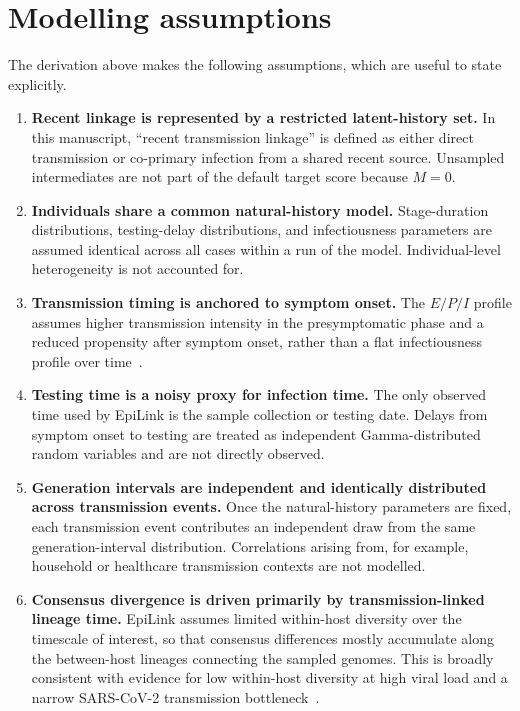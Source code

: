 \documentclass[11pt,a4paper]{article}
\begin{document}
\section{Modelling assumptions}\label{sec:S1_assumptions}

The derivation above makes the following assumptions, which are useful to state explicitly.

\begin{enumerate}

	\item \textbf{Recent linkage is represented by a restricted latent-history set.}
	      In this manuscript, ``recent transmission linkage'' is defined as either direct transmission or co-primary infection from a shared recent source. Unsampled intermediates are not part of the default target score because $M = 0$.

	\item \textbf{Individuals share a common natural-history model.}
	      Stage-duration distributions, testing-delay distributions, and infectiousness parameters are assumed identical across all cases within a run of the model. Individual-level heterogeneity is not accounted for.

	\item \textbf{Transmission timing is anchored to symptom onset.}
	      The $E/P/I$ profile assumes higher transmission intensity in the presymptomatic phase and a reduced propensity after symptom onset, rather than a flat infectiousness profile over time~\cite{Hart2021, He2020, Ferretti2020}.

	\item \textbf{Testing time is a noisy proxy for infection time.}
	      The only observed time used by EpiLink is the sample collection or testing date. Delays from symptom onset to testing are treated as independent Gamma-distributed random variables and are not directly observed.

	\item \textbf{Generation intervals are independent and identically distributed across transmission events.}
	      Once the natural-history parameters are fixed, each transmission event contributes an independent draw from the same generation-interval distribution. Correlations arising from, for example, household or healthcare transmission contexts are not modelled.

	\item \textbf{Consensus divergence is driven primarily by transmission-linked lineage time.}
	      EpiLink assumes limited within-host diversity over the timescale of interest, so that consensus differences mostly accumulate along the between-host lineages connecting the sampled genomes. This is broadly consistent with evidence for low within-host diversity at high viral load and a narrow SARS-CoV-2 transmission bottleneck~\cite{Lythgoe2021}.


\end{enumerate}
\end{document}
